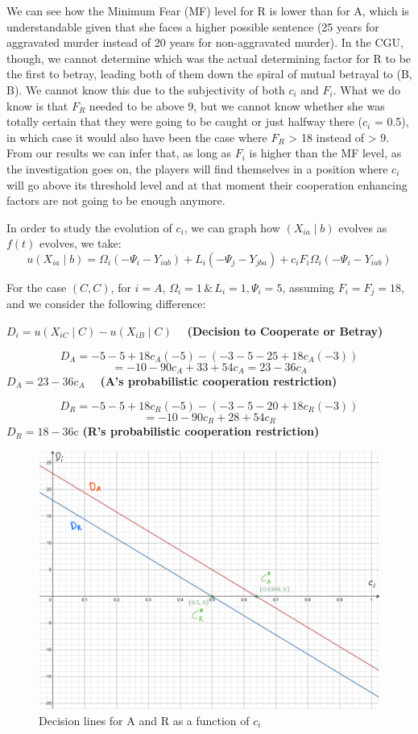 \documentclass[11pt, a4paper]{article}
\begin{document}
We can see how the Minimum Fear (MF) level for R is lower than for A, which is understandable
given that she faces a higher possible sentence (25 years for aggravated murder instead of
20 years for non-aggravated murder).
In the CGU, though, we cannot determine which was the actual determining factor for R
to be the first to betray, leading both of them down the spiral of mutual betrayal to (B, B).
We cannot know this due to the subjectivity of both $c_i$ and $F_i$. What we do know is that
$F_R$ needed to be above 9, but we cannot know whether she was totally certain that
they were going to be caught or just halfway there ($c_i$ = 0.5), in which case it would also
have been the case where $F_R$ > 18 instead of > 9.
From our results we can infer that, as long as $F_i$ is higher than the MF level, as the
investigation goes on, the players will find themselves in a position where $c_i$ will go above
its threshold level and at that moment their cooperation enhancing factors are not going to
be enough anymore.

In order to study the evolution of $c_i$, we can graph how $\left(X_{i a} \mid b\right)$ evolves as $f(t)$ evolves, we take:
$$
u\left(X_{i a} \mid b\right)=\Omega_i\left(-\Psi_i-Y_{i a b}\right)+L_i\left(-\Psi_j-Y_{j b a}\right)+c_i F_i \Omega_i\left(-\Psi_i-Y_{i a b}\right)
$$

For the case $(C, C)$, for $i=A, \, \Omega_i=1 \, \& \, L_i=1, \Psi_i=5$, assuming $F_i=F_j=18$, and we consider the following difference:

\begin{center}
$D_i=u\left(X_{i C} \mid C\right)-u\left(X_{i B} \mid C\right) \quad$ \textbf{(Decision to Cooperate or Betray)}

$$
D_A =-5-5+18 c_A(-5)-\left(-3-5-25+18 c_A(-3)\right)
$$
$$
=-10-90 c_A+33+54 c_A=23-36 c_A
$$
$D_A=23-36 c_A \quad$ \textbf{(A's probabilistic cooperation restriction)}

$$
D_R =-5-5+18 c_R(-5)-\left(-3-5-20+18 c_R(-3)\right)
$$
$$
 =-10-90 c_R+28+54 c_R
$$
$D_R=18-36 \mathrm{c}$ \textbf{(R's probabilistic cooperation restriction)}\newline
\end{center}


\begin{figure}[htbp]
\centering
\includegraphics[width=0.8\linewidth]{figure1.png}
\caption{Decision lines for A and R as a function of $c_i$}
\label{fig:my_label}
\end{figure}
\end{document}
